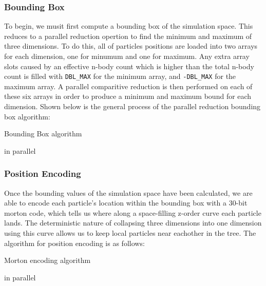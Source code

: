 \documentclass{thesis}
\begin{document}
\subsubsection{Bounding Box}
To begin, we musit first compute a bounding box of the simulation space. This reduces to a parallel reduction opertion to find the minimum and maximum of three dimensions. To do this, all of particles positions are loaded into two arrays for each dimension, one for minumum and one for maximum. Any extra array slots caused by an effective n-body count which is higher than the total n-body count is filled with \verb|DBL_MAX| for the minimum array, and \verb|-DBL_MAX| for the maximum array. A parallel comparitive reduction is then performed on each of these six arrays in order to produce a minimum and maximum bound for each dimension. Shown below is the general process of the parallel reduction bounding box algorithm:
\begin{algorithm}
    \label{alg:BoundingBox}
    \caption{Bounding Box algorithm}
    \begin{algorithmic}
             in parallel
            \EndFor
        \EndFor
    \end{algorithmic}
\end{algorithm}
\subsubsection{Position Encoding}
Once the bounding values of the simulation space have been calculated, we are able to encode each particle's location within the bounding box with a 30-bit morton code, which tells us where along a space-filling z-order curve each particle lands. The deterministic nature of collapsing three dimensions into one dimension using this curve allows us to keep local particles near eachother in the tree. The algorithm for position encoding is as follows:
\begin{algorithm}
    \label{alg:PositionEncoding}
    \caption{Morton encoding algorithm}
    \begin{algorithmic}
         in parallel    
        \EndFor
    \end{algorithmic}
\end{algorithm}
\end{document}
